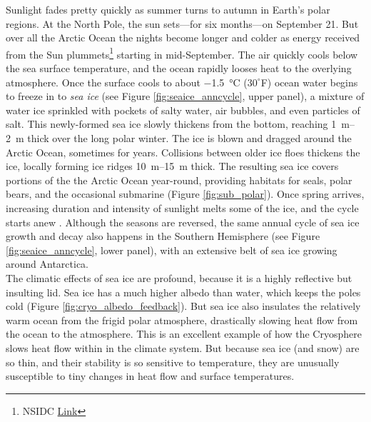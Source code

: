Sunlight fades pretty quickly as summer turns to autumn in Earth's polar regions. At the North Pole, the sun sets---for six months---on September 21. But over all the Arctic Ocean the nights become longer and colder as energy received from the Sun plummets\footnote{NSIDC \href{http://nsidc.org/arcticseaicenews/2017/09/arctic-sea-ice-at-minimum-extent-2/}{Link}} starting in mid-September. The air quickly cools below the sea surface temperature, and the ocean rapidly looses heat to the overlying atmosphere. Once the surface cools to about \SI{-1.5}{\celsius} ($30^{\circ}$F) ocean water begins to freeze in to \emph{sea ice} (see Figure \ref{fig:seaice_anncycle}, upper panel), a mixture of water ice sprinkled with pockets of salty water, air bubbles, and even particles of salt. This newly-formed sea ice slowly thickens from the bottom, reaching \SIrange{1}{2}{\metre} thick over the long polar winter. The ice is blown and dragged around the Arctic Ocean, sometimes for years. Collisions between older ice floes thickens the ice, locally forming ice ridges \SIrange{10}{15}{\metre} thick. The resulting sea ice covers portions of the the Arctic Ocean year-round, providing habitats for seals, polar bears, and the occasional submarine (Figure \ref{fig:sub_polar}). Once spring arrives, increasing duration and intensity of sunlight melts some of the ice, and the cycle starts anew . Although the seasons are reversed, the same annual cycle of sea ice growth and decay also happens in the Southern Hemisphere (see Figure \ref{fig:seaice_anncycle}, lower panel), with an extensive belt of sea ice growing around Antarctica.\\ 
     
The climatic effects of sea ice are profound, because it is a highly reflective but insulting lid. Sea ice has a much higher albedo than water, which keeps the poles cold (Figure \ref{fig:cryo_albedo_feedback}). But sea ice also insulates the relatively warm ocean from the frigid polar atmosphere, drastically slowing heat flow from the ocean to the atmosphere. This is an excellent example of how the Cryosphere slows heat flow within in the climate system. But because sea ice (and snow) are so thin, and their stability is so sensitive to temperature, they are unusually susceptible to tiny changes in heat flow and surface temperatures.\\

